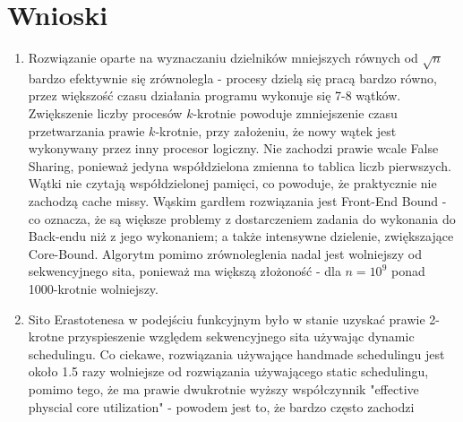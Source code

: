 \documentclass[12pt]{article}
\begin{document}
\section{Wnioski}
\begin{enumerate}
	\item Rozwiązanie oparte na wyznaczaniu dzielników mniejszych równych od \(\sqrt{n}\) bardzo efektywnie się zrównolegla - procesy dzielą się pracą bardzo równo, przez większość czasu działania programu wykonuje się 7-8 wątków. Zwiększenie liczby procesów \(k\)-krotnie powoduje zmniejszenie czasu przetwarzania prawie \(k\)-krotnie, przy założeniu, że nowy wątek jest wykonywany przez inny procesor logiczny. Nie zachodzi prawie wcale False Sharing, ponieważ jedyna współdzielona zmienna to tablica liczb pierwszych. Wątki nie czytają współdzielonej pamięci, co powoduje, że praktycznie nie zachodzą cache missy. Wąskim gardłem rozwiązania jest Front-End Bound - co oznacza, że są większe problemy z dostarczeniem zadania do wykonania do Back-endu niż z jego wykonaniem; a także intensywne dzielenie, zwiększające Core-Bound. Algorytm pomimo zrównoleglenia nadal jest wolniejszy od sekwencyjnego sita, ponieważ ma większą złożoność - dla \(n=10^9\) ponad 1000-krotnie wolniejszy.
	\item Sito Erastotenesa w podejściu funkcyjnym było w stanie uzyskać prawie 2-krotne przyspieszenie względem sekwencyjnego sita używając dynamic schedulingu. Co ciekawe, rozwiązania używające handmade schedulingu jest około 1.5 razy wolniejsze od rozwiązania używającego static schedulingu, pomimo tego, że ma prawie dwukrotnie wyższy współczynnik "effective physcial core utilization" - powodem jest to, że bardzo często zachodzi
	

\end{enumerate}
\end{document}
